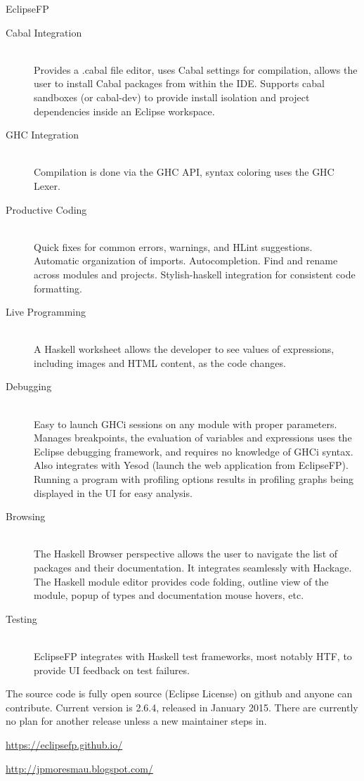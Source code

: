 \begin{hcarentry}[updated]{EclipseFP}
\begin{description}
  \item[Cabal Integration] \hfill \\ Provides a .cabal file editor, uses Cabal
    settings for compilation, allows the user to install Cabal packages from
    within the IDE. Supports cabal sandboxes (or cabal-dev) to provide install isolation and project
    dependencies inside an Eclipse workspace.  \item[GHC Integration] \hfill
    \\ Compilation is done via the GHC API, syntax coloring uses the GHC
  Lexer.  \item[Productive Coding] \hfill \\ Quick fixes for common errors,
    warnings, and HLint suggestions. Automatic organization of imports.
    Autocompletion. Find and rename across modules and projects.
    Stylish-haskell integration for consistent code formatting.
  \item[Live Programming] \hfill \\ A Haskell worksheet allows the developer to see
    values of expressions, including images and HTML content, as the code changes.
  \item[Debugging] \hfill \\ Easy to launch GHCi sessions on any module with
    proper parameters. Manages breakpoints, the evaluation of variables and
    expressions uses the Eclipse debugging framework, and requires no
    knowledge of GHCi syntax. Also integrates with Yesod (launch the web
    application from EclipseFP). Running a program with profiling options
    results in profiling graphs being displayed in the UI for easy analysis.
  \item[Browsing] \hfill \\ The Haskell Browser perspective allows the user to
    navigate the list of packages and their documentation. It integrates
    seamlessly with Hackage. The Haskell module editor provides code folding,
    outline view of the module, popup of types and documentation mouse hovers,
    etc.  \item[Testing] \hfill \\ EclipseFP integrates with Haskell test
      frameworks, most notably HTF, to provide UI feedback on test failures.
\end{description}

The source code is fully open source (Eclipse License) on github and anyone
can contribute. Current version is 2.6.4, released in January 2015. There are
currently no plan for another release unless a new maintainer steps in.

\FurtherReading
\begin{compactitem}
\item \url{https://eclipsefp.github.io/}
\item \url{http://jpmoresmau.blogspot.com/}
\end{compactitem}
\end{hcarentry}
